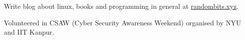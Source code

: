 \documentclass[11pt, a4paper]{cv}
\begin{document}

\begin{cventries}
        \begin{cvitems}
        \item {Write blog about linux, books and programming in general at \href{http://randombits.xyz}{randombits.xyz}.}
        \item {Volunteered in CSAW (Cyber Security Awareness Weekend) organised by NYU and IIT Kanpur.}
        \end{cvitems}
\end{cventries}

\end{document}
